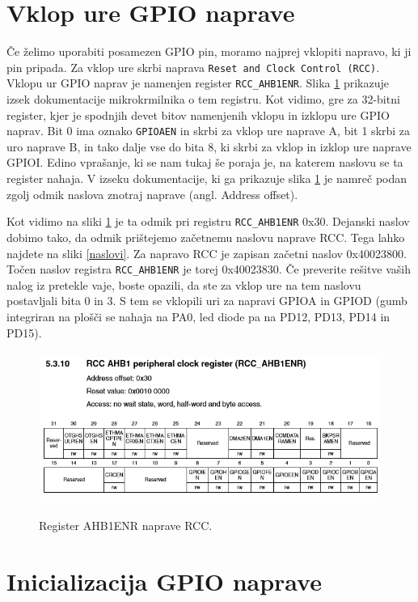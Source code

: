 \documentclass[12pt,letterpaper]{article}
\begin{document}
\section*{Vklop ure GPIO naprave}

Če želimo uporabiti posamezen GPIO pin, moramo najprej vklopiti napravo, ki ji pin pripada. Za vklop ure skrbi naprava \texttt{Reset and Clock Control (RCC)}. Vklopu ur GPIO naprav je namenjen register \texttt{RCC\_AHB1ENR}. Slika \ref{ahb1enr} prikazuje izsek dokumentacije mikrokrmilnika o tem registru. Kot vidimo, gre za 32-bitni register, kjer je spodnjih devet bitov namenjenih vklopu in izklopu ure GPIO naprav. Bit 0 ima oznako \texttt{GPIOAEN} in skrbi za vklop ure naprave A, bit 1 skrbi za uro naprave B, in tako dalje vse do bita 8, ki skrbi za vklop in izklop ure naprave GPIOI. Edino vprašanje, ki se nam tukaj še poraja je, na katerem naslovu se ta register nahaja. V izseku dokumentacije, ki ga prikazuje slika \ref{ahb1enr} je namreč podan zgolj odmik naslova znotraj naprave (angl. Address offset).

Kot vidimo na sliki \ref{ahb1enr} je ta odmik pri registru \texttt{RCC\_AHB1ENR} 0x30. Dejanski naslov dobimo tako, da odmik prištejemo začetnemu naslovu naprave RCC. Tega lahko najdete na sliki \ref{naslovi}. Za napravo RCC je zapisan začetni naslov 0x40023800. Točen naslov registra \texttt{RCC\_AHB1ENR} je torej 0x40023830. Če preverite rešitve vaših nalog iz pretekle vaje, boste opazili, da ste za vklop ure na tem naslovu postavljali bita 0 in 3. S tem se vklopili uri za napravi GPIOA in GPIOD (gumb integriran na plošči se nahaja na PA0, led diode pa na PD12, PD13, PD14 in PD15).

\begin{figure}[ht!]
  \centering
  \caption{Register AHB1ENR naprave RCC.}
  \includegraphics[height=140pt]{images/vaja3/ahb1enr.png}
  \label{ahb1enr}
\end{figure}


\section*{Inicializacija GPIO naprave}
\end{document}

